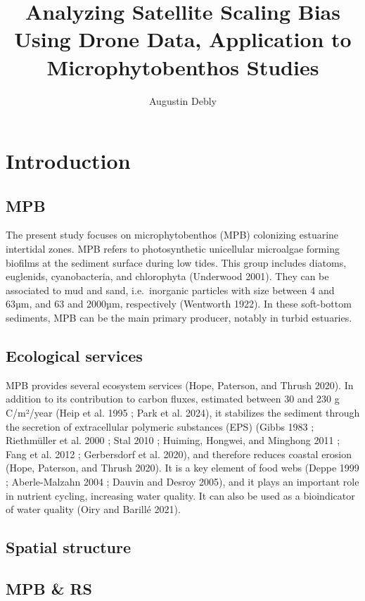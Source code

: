 \documentclass[
  letterpaper,
  DIV=11,
  numbers=noendperiod]{scrartcl}
\title{Analyzing Satellite Scaling Bias Using Drone Data, Application to
Microphytobenthos Studies}
\author{Augustin Debly}
\date{}
\begin{document}
\maketitle

\section{Introduction}\label{introduction}

\subsection{MPB}\label{mpb}

The present study focuses on microphytobenthos (MPB) colonizing
estuarine intertidal zones. MPB refers to photosynthetic unicellular
microalgae forming biofilms at the sediment surface during low tides.
This group includes diatoms, euglenids, cyanobacteria, and chlorophyta
(Underwood 2001). They can be associated to mud and sand, i.e.~inorganic
particles with size between 4 and 63µm, and 63 and 2000µm, respectively
(Wentworth 1922). In these soft-bottom sediments, MPB can be the main
primary producer, notably in turbid estuaries.

\subsection{Ecological services}\label{ecological-services}

MPB provides several ecosystem services (Hope, Paterson, and Thrush
2020). In addition to its contribution to carbon fluxes, estimated
between 30 and 230 g C/m²/year (Heip et al. 1995 ; Park et al. 2024), it
stabilizes the sediment through the secretion of extracellular polymeric
substances (EPS) (Gibbs 1983 ; Riethmüller et al. 2000 ; Stal 2010 ;
Huiming, Hongwei, and Minghong 2011 ; Fang et al. 2012 ; Gerbersdorf et
al. 2020), and therefore reduces coastal erosion (Hope, Paterson, and
Thrush 2020). It is a key element of food webs (Deppe 1999 ;
Aberle-Malzahn 2004 ; Dauvin and Desroy 2005), and it plays an important
role in nutrient cycling, increasing water quality. It can also be used
as a bioindicator of water quality (Oiry and Barillé 2021).

\subsection{Spatial structure}\label{spatial-structure}

\subsection{MPB \& RS}\label{mpb-rs}
\end{document}
